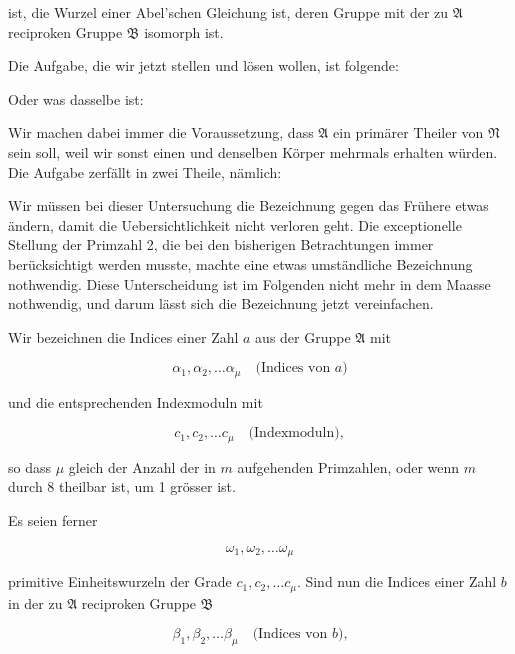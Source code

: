 
ist, die Wurzel einer Abel'schen Gleichung ist, deren Gruppe mit der zu $\mathfrak{A}$ reciproken Gruppe $\mathfrak{B}$ isomorph ist.

Die Aufgabe, die wir jetzt stellen und lösen wollen, ist folgende:


Oder was dasselbe ist:


Wir machen dabei immer die Voraussetzung, dass $\mathfrak{A}$ ein primärer Theiler von $\mathfrak{N}$ sein soll, weil wir sonst einen und denselben Körper mehrmals erhalten würden. Die Aufgabe zerfällt in zwei Theile, nämlich:



Wir müssen bei dieser Untersuchung die Bezeichnung gegen das Frühere etwas ändern, damit die Uebersichtlichkeit nicht verloren geht. Die exceptionelle Stellung der Primzahl 2, die bei den bisherigen Betrachtungen immer berücksichtigt werden musste, machte eine etwas umständliche Bezeichnung nothwendig. Diese Unterscheidung ist im Folgenden nicht mehr in dem Maasse nothwendig, und darum lässt sich die Bezeichnung jetzt vereinfachen.

Wir bezeichnen die Indices einer Zahl $a$ aus der Gruppe $\mathfrak{A}$ mit

\[
\alpha_1, \alpha_2, \dots \alpha_\mu \quad \text{(Indices von $a$)}
\]

und die entsprechenden Indexmoduln mit

\[
c_1, c_2, \dots c_\mu \quad \text{(Indexmoduln)},
\]

so dass $\mu$ gleich der Anzahl der in $m$ aufgehenden Primzahlen, oder wenn $m$ durch 8 theilbar ist, um 1 grösser ist.

Es seien ferner

\[
\omega_1, \omega_2, \dots \omega_\mu
\]

primitive Einheitswurzeln der Grade $c_1, c_2, \dots c_\mu$. Sind nun die Indices einer Zahl $b$ in der zu $\mathfrak{A}$ reciproken Gruppe $\mathfrak{B}$

\[
\beta_1, \beta_2, \dots \beta_\mu \quad \text{(Indices von $b$),}
\]

